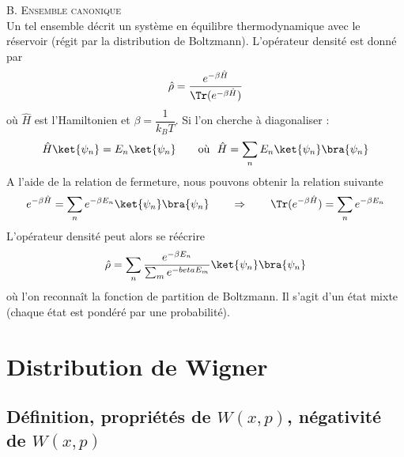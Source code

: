 \textsc{B. Ensemble canonique}\\
Un tel ensemble décrit un système en équilibre thermodynamique avec le réservoir (régit par la distribution de 
Boltzmann). L'opérateur densité est donné par
\begin{equation}
\hat{\rho} = \dfrac{e^{-\beta\hat{H}}}{\Tr(e^{-\beta\hat{H}})}
\end{equation}
où $\hat{H}$ est l'Hamiltonien et $\beta = \dfrac{1}{k_BT}$. Si l'on cherche à diagonaliser :
\begin{equation}
\hat{H}\ket{\psi_n} = E_n\ket{\psi_n}\qquad \text{où }\ \hat{H} = \sum_n E_n\ket{\psi_n}\bra{\psi_n}
\end{equation}
A l'aide de la relation de fermeture, nous pouvons obtenir la relation suivante
\begin{equation}
e^{-\beta\hat{H}} = \sum_n e^{-\beta E_n}\ket{\psi_n}\bra{\psi_n}\qquad\Rightarrow\qquad \Tr(e^{-\beta \hat{H}}) = 
\sum_n e^{-\beta E_n}
\end{equation}
L'opérateur densité peut alors se réécrire
\begin{equation}
\hat{\rho} = \sum_n \dfrac{e^{-\beta E_n}}{\sum_m e^{-beta E_m}} \ket{\psi_n}\bra{\psi_n}
\end{equation}
où l'on reconnaît la fonction de partition de Boltzmann. Il s'agit d'un état mixte (chaque état est pondéré par
une probabilité). 

 

\section{Distribution de Wigner}
\subsection{Définition, propriétés de $W(x,p)$, négativité de $W(x,p)$}
